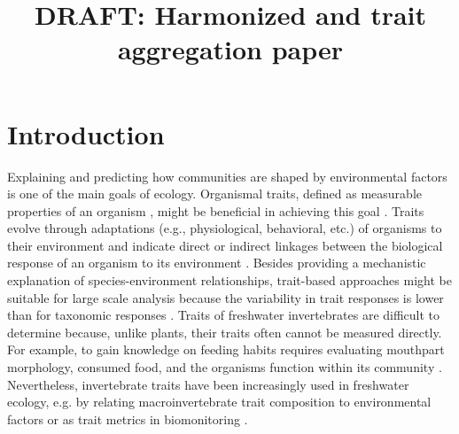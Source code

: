 \documentclass{article}
\title{DRAFT: Harmonized and trait aggregation paper }
\author{}%
\date{}
\begin{document}
\maketitle

\section*{Introduction}


Explaining and predicting how communities are shaped by environmental factors is one of the main goals of ecology. Organismal traits, defined as measurable properties of an organism \cite{mcgill_rebuilding_2006}, might be beneficial in achieving this goal \cite{heino_jani_macroecological_2013}. Traits evolve through adaptations (e.g., physiological, behavioral, etc.) of organisms to their environment and indicate direct or indirect linkages between the biological response of an organism to its environment \cite{southwood_habitat_1977, verberk_delivering_2013}. Besides providing a mechanistic explanation of species-environment relationships, trait-based approaches might be suitable for large scale analysis because the variability in trait responses is lower than for taxonomic responses \cite{bonada_taxonomic_2007, baird_toward_2011}. Traits of freshwater invertebrates are difficult to determine because, unlike plants, their traits often cannot be measured directly. For example, to gain knowledge on feeding habits requires evaluating mouthpart morphology, consumed food, and the organisms function within its community \cite{moog_comprehensive_nodate}. Nevertheless, invertebrate traits have been increasingly used in freshwater ecology, e.g. by relating macroinvertebrate trait composition to environmental factors or as trait metrics in biomonitoring \cite{poff_developing_2010, szocs_effects_2014, bhowmik_large_2015, menezes_beyond_2010}.

\end{document}
